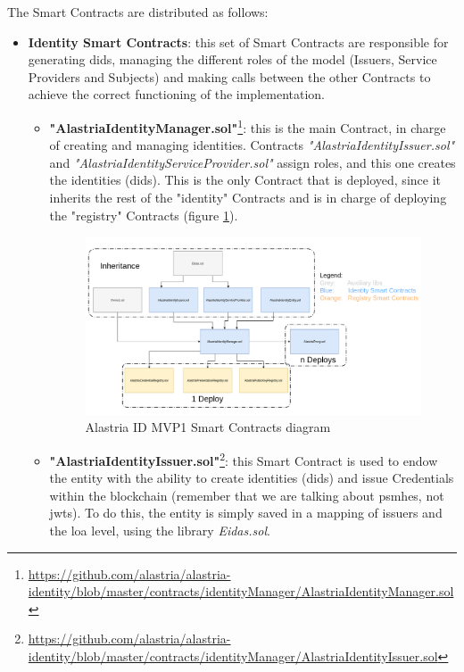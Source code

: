 \documentclass[a4paper, 12pt]{article} %
\begin{document}
            The Smart Contracts are distributed as follows:
            \begin{itemize}
                \item \textbf{Identity Smart Contracts}: this set of Smart Contracts are responsible for generating \acrshort{did}s, managing the different roles of the model (Issuers, Service Providers and Subjects) and making calls between the other Contracts to achieve the correct functioning of the implementation.
                \begin{itemize}
                    \item \textbf{"AlastriaIdentityManager.sol"}\footnote{\url{https://github.com/alastria/alastria-identity/blob/master/contracts/identityManager/AlastriaIdentityManager.sol}}: this is the main Contract, in charge of creating and managing identities. Contracts \textit{"AlastriaIdentityIssuer.sol"} and \textit{"AlastriaIdentityServiceProvider.sol"} assign roles, and this one creates the identities (\acrshort{did}s). This is the only Contract that is deployed, since it inherits the rest of the "identity" Contracts and is in charge of deploying the "registry" Contracts (figure \ref{fig:mvp1-contracts}).
                    \begin{figure}[h]
                        \centering
                        \includegraphics[width=1.0\textwidth]{SCs-Diagram.png}
                        \caption{Alastria ID MVP1 Smart Contracts diagram}
                        \label{fig:mvp1-contracts}
                    \end{figure}
                    \item \textbf{"AlastriaIdentityIssuer.sol"}\footnote{\url{https://github.com/alastria/alastria-identity/blob/master/contracts/identityManager/AlastriaIdentityIssuer.sol}}: this Smart Contract is used to endow the entity with the ability to create identities (\acrshort{did}s) and issue Credentials within the blockchain (remember that we are talking about \acrshort{psmh}es, not \acrshort{jwt}s). To do this, the entity is simply saved in a mapping of issuers and the \acrshort{loa} level, using the library \textit{Eidas.sol}.

\end{itemize}
\end{itemize}
\end{document}
